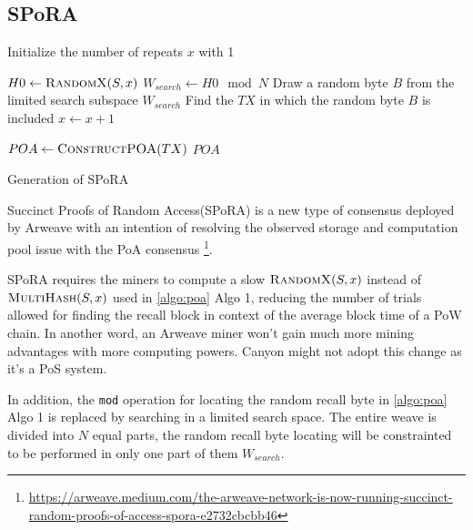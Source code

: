 \documentclass[]{article}
\begin{document}
\subsection{SPoRA}

\IncMargin{1em}
\begin{algorithm}
    \label{algo:spora}

    \SetAlgoNoLine

    \BlankLine

    Initialize the number of repeats $x$ with 1\;
    \BlankLine

    \Repeat
        {}
        {
        $H0 \leftarrow \Call{RandomX}{S, x}$\;
        $W_{search} \leftarrow H0 \mod N$\;
        Draw a random byte $B$ from the limited search subspace $W_{search}$\;
        Find the $TX$ in which the random byte $B$ is included\;
        {$x \leftarrow x + 1$}\;
    }

    \BlankLine
    $POA \leftarrow \Call{ConstructPOA}{TX}$\;
    \Return $POA$\;
    \caption{Generation of SPoRA}
\end{algorithm}
\DecMargin{1em}

Succinct Proofs of Random Access(SPoRA) is a new type of consensus deployed by Arweave with an intention of resolving the observed storage and computation pool issue with the PoA consensus \footnote{\url{https://arweave.medium.com/the-arweave-network-is-now-running-succinct-random-proofs-of-access-spora-e2732cbcbb46}}.

SPoRA requires the miners to compute a slow $\Call{RandomX}{S, x}$ instead of $\Call{MultiHash}{S, x}$ used in \ref{algo:poa}{ Algo 1}, reducing the number of trials allowed for finding the recall block in context of the average block time of a PoW chain. In another word, an Arweave miner won't gain much more mining advantages with more computing powers. Canyon might not adopt this change as it's a PoS system.

In addition, the \texttt{mod} operation for locating the random recall byte in \ref{algo:poa}{ Algo 1} is replaced by searching in a limited search space. The entire weave is divided into $N$ equal parts, the random recall byte locating will be constrainted to be performed in only one part of them $W_{search}$.
\end{document}
